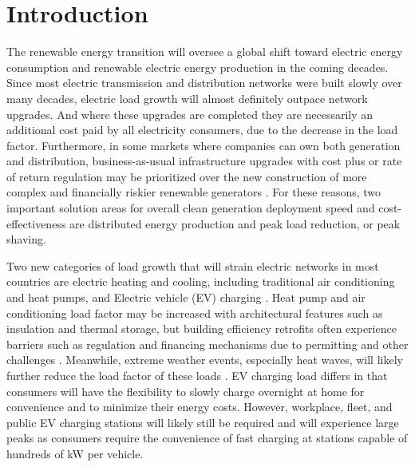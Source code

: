 \documentclass[journal,article,submit,pdftex,moreauthors]{Definitions/mdpi}
\begin{document}


\section{Introduction}\label{introduction}


The renewable energy transition will oversee a global shift toward electric energy consumption and renewable electric energy production in the coming decades. Since most electric transmission and distribution networks were built slowly over many decades, electric load growth will almost definitely outpace network upgrades. And where these upgrades are completed they are necessarily an additional cost paid by all electricity consumers, due to the decrease in the load factor. Furthermore, in some markets where companies can own both generation and distribution, business-as-usual infrastructure upgrades with cost plus or rate of return regulation may be prioritized over the new construction of more complex and financially riskier renewable generators \cite{Wagner2019}. For these reasons, two important solution areas for overall clean generation deployment speed and cost-effectiveness are distributed energy production and peak load reduction, or peak shaving.

Two new categories of load growth that will strain electric networks in most countries are electric heating and cooling, including traditional air conditioning and heat pumps, and Electric vehicle (EV) charging \cite{Bobmann2015}. Heat pump and air conditioning load factor may be increased with architectural features such as insulation and thermal storage, but building efficiency retrofits often experience barriers such as regulation and financing mechanisms due to permitting and other challenges \cite{Bertone2016}. Meanwhile, extreme weather events, especially heat waves, will likely further reduce the load factor of these loads \cite{Villa2022}. EV charging load differs in that consumers will have the flexibility to slowly charge overnight at home for convenience and to minimize their energy costs. However, workplace, fleet, and public EV charging stations will likely still be required and will experience large peaks as consumers require the convenience of fast charging at stations capable of hundreds of kW per vehicle.
\end{document}
